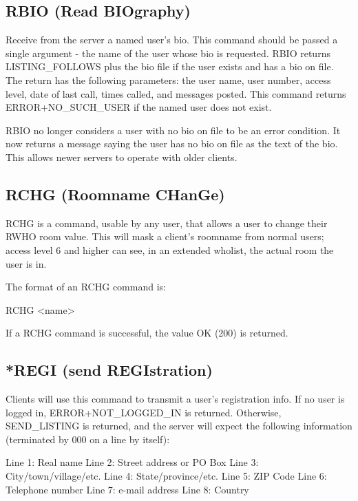 \subsection{RBIO (Read BIOgraphy)}

 Receive from the server a named user's bio.  This command should be passed
a single argument - the name of the user whose bio is requested.  RBIO returns
LISTING_FOLLOWS plus the bio file if the user exists and has a bio on file.
The return has the following parameters:  the user name, user number, access
level, date of last call, times called, and messages posted.  This command
returns ERROR+NO_SUCH_USER if the named user does not exist.

 RBIO no longer considers a user with no bio on file to be an error condition.
It now returns a message saying the user has no bio on file as the text of the
bio.  This allows newer servers to operate with older clients.



\subsection{RCHG (Roomname CHanGe)}

 RCHG is a command, usable by any user, that allows a user to change their RWHO
room value.  This will mask a client's roomname from normal users; access
level 6 and higher can see, in an extended wholist, the actual room the user
is in.

 The format of an RCHG command is:

 RCHG <name>

 If a RCHG command is successful, the value OK (200) is returned.



\subsection{*REGI (send REGIstration)}

 Clients will use this command to transmit a user's registration info.  If
no user is logged in, ERROR+NOT_LOGGED_IN is returned.  Otherwise,
SEND_LISTING is returned, and the server will expect the following information
(terminated by 000 on a line by itself):

 Line 1:  Real name
 Line 2:  Street address or PO Box
 Line 3:  City/town/village/etc.
 Line 4:  State/province/etc.
 Line 5:  ZIP Code
 Line 6:  Telephone number
 Line 7:  e-mail address
 Line 8:  Country



